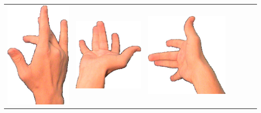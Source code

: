 \documentclass{article}
\begin{document}
\begin{center}
\begin{tabular}{r*{6}{c}}
\includegraphics[scale=0.1]{images/08-03-3.jpg}&
\includegraphics[scale=0.1]{images/08-03-4.jpg}&
\includegraphics[scale=0.1]{images/08-03-5.jpg}&

\end{tabular}
\end{center}
\end{document}
